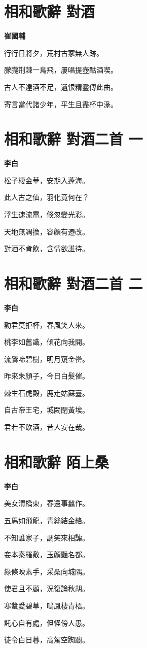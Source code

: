 \documentclass[12pt,a4paper]{ctexbook}
\begin{document}
\section{相和歌辭 對酒}
\textbf{崔國輔}\par\vspace{0.5em}
行行日將夕，荒村古冢無人跡。\par
朦朧荆棘一鳥飛，屢唱提壺酤酒喫。\par
古人不達酒不足，遺恨精靈傳此曲。\par
寄言當代諸少年，平生且盡杯中淥。\par

\section{相和歌辭 對酒二首 一}
\textbf{李白}\par\vspace{0.5em}
松子棲金華，安期入蓬海。\par
此人古之仙，羽化竟何在？\par
浮生速流電，倏忽變光彩。\par
天地無凋換，容顏有遷改。\par
對酒不肯飲，含情欲誰待。\par

\section{相和歌辭 對酒二首 二}
\textbf{李白}\par\vspace{0.5em}
勸君莫拒杯，春風笑人來。\par
桃李如舊識，傾花向我開。\par
流鶯啼碧樹，明月窺金罍。\par
昨來朱顏子，今日白髮催。\par
棘生石虎殿，鹿走姑蘇臺。\par
自古帝王宅，城闕閉黃埃。\par
君若不飲酒，昔人安在哉。\par

\section{相和歌辭 陌上桑}
\textbf{李白}\par\vspace{0.5em}
美女渭橋東，春還事蠶作。\par
五馬如飛龍，青絲結金絡。\par
不知誰家子，調笑來相謔。\par
妾本秦羅敷，玉顏豔名都。\par
綠條映素手，采桑向城隅。\par
使君且不顧，況復論秋胡。\par
寒螿愛碧草，鳴鳳棲青梧。\par
託心自有處，但怪傍人愚。\par
徒令白日暮，高駕空踟躕。\par
\end{document}
